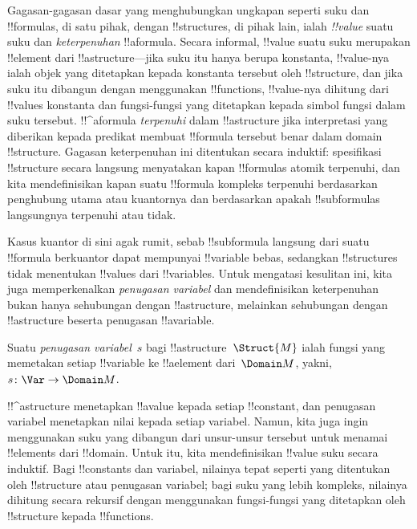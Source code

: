 \documentclass[../../../include/open-logic-section]{subfiles}
\begin{document}


\begin{explain}
Gagasan-gagasan dasar yang menghubungkan ungkapan seperti suku dan
!!{formula}s, di satu pihak, dengan !!{structure}s, di pihak lain, ialah
\emph{!!{value}} suatu suku dan \emph{keterpenuhan} !!a{formula}. Secara
informal, !!{value} suatu suku merupakan !!{element} dari
!!a{structure}---jika suku itu hanya berupa konstanta, !!{value}-nya ialah
objek yang ditetapkan kepada konstanta tersebut oleh !!{structure}, dan jika
suku itu dibangun dengan menggunakan !!{function}s, !!{value}-nya dihitung
dari !!{value}s konstanta dan fungsi-fungsi yang ditetapkan kepada
simbol fungsi dalam suku tersebut. !!^a{formula} \emph{terpenuhi} dalam
!!a{structure} jika interpretasi yang diberikan kepada predikat membuat
!!{formula} tersebut benar dalam domain !!{structure}. Gagasan keterpenuhan
ini ditentukan secara induktif: spesifikasi !!{structure} secara langsung
menyatakan kapan !!{formula}s atomik terpenuhi, dan kita mendefinisikan kapan
suatu !!{formula} kompleks terpenuhi berdasarkan penghubung utama atau
kuantornya dan berdasarkan apakah !!{subformula}s langsungnya terpenuhi atau
tidak.

Kasus kuantor di sini agak rumit, sebab !!{subformula} langsung dari suatu
!!{formula} berkuantor dapat mempunyai !!{variable} bebas, sedangkan
!!{structure}s tidak menentukan !!{value}s dari !!{variable}s. Untuk
mengatasi kesulitan ini, kita juga memperkenalkan \emph{penugasan variabel}
dan mendefinisikan keterpenuhan bukan hanya sehubungan dengan
!!a{structure}, melainkan sehubungan dengan !!a{structure} beserta
penugasan !!a{variable}.
\end{explain}

\begin{defn}
Suatu \emph{penugasan variabel}~$s$ bagi !!a{structure}~$\Struct{M}$ ialah
fungsi yang memetakan setiap !!{variable} ke !!a{element} dari~$\Domain M$,
yakni, $s\colon \Var \to \Domain M$.
\end{defn}

\begin{explain}
!!^a{structure} menetapkan !!a{value} kepada setiap !!{constant}, dan
penugasan variabel menetapkan nilai kepada setiap variabel. Namun, kita juga
ingin menggunakan suku yang dibangun dari unsur-unsur tersebut untuk menamai
!!{element}s dari !!{domain}. Untuk itu, kita mendefinisikan !!{value} suku
secara induktif. Bagi !!{constant}s dan variabel, nilainya tepat seperti yang
ditentukan oleh !!{structure} atau penugasan variabel; bagi suku yang lebih
kompleks, nilainya dihitung secara rekursif dengan menggunakan fungsi-fungsi
yang ditetapkan oleh !!{structure} kepada !!{function}s.
\end{explain}
\end{document}
